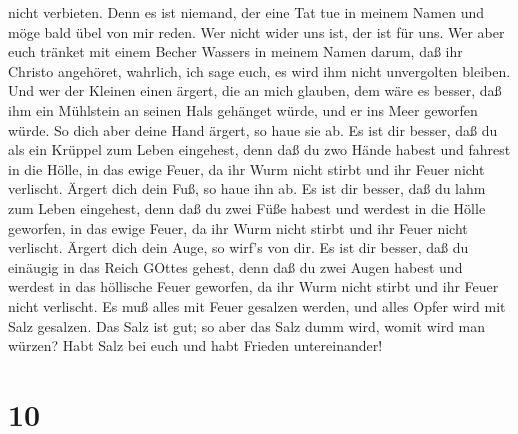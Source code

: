nicht verbieten. Denn es ist niemand, der eine Tat tue in meinem Namen
und möge bald übel von mir reden.  Wer nicht wider uns ist,
der ist für uns.  Wer aber euch tränket mit einem Becher
Wassers in meinem Namen darum, daß ihr Christo angehöret, wahrlich, ich
sage euch, es wird ihm nicht unvergolten bleiben.  Und wer
der Kleinen einen ärgert, die an mich glauben, dem wäre es besser, daß
ihm ein Mühlstein an seinen Hals gehänget würde, und er ins Meer
geworfen würde.  So dich aber deine Hand ärgert, so haue
sie ab. Es ist dir besser, daß du als ein Krüppel zum Leben eingehest,
denn daß du zwo Hände habest und fahrest in die Hölle, in das ewige
Feuer,  da ihr Wurm nicht stirbt und ihr Feuer nicht
verlischt.  Ärgert dich dein Fuß, so haue ihn ab. Es ist
dir besser, daß du lahm zum Leben eingehest, denn daß du zwei Füße
habest und werdest in die Hölle geworfen, in das ewige Feuer,
 da ihr Wurm nicht stirbt und ihr Feuer nicht verlischt.
 Ärgert dich dein Auge, so wirf's von dir. Es ist dir
besser, daß du einäugig in das Reich GOttes gehest, denn daß du zwei
Augen habest und werdest in das höllische Feuer geworfen, 
da ihr Wurm nicht stirbt und ihr Feuer nicht verlischt.  Es
muß alles mit Feuer gesalzen werden, und alles Opfer wird mit Salz
gesalzen.  Das Salz ist gut; so aber das Salz dumm wird,
womit wird man würzen? Habt Salz bei euch und habt Frieden
untereinander!

\hypertarget{section-9}{%
\section{10}\label{section-9}}

